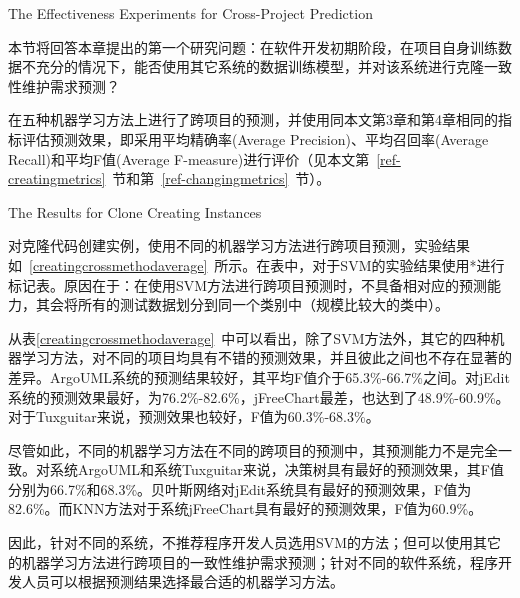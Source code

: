 {The Effectiveness Experiments for Cross-Project Prediction}

本节将回答本章提出的第一个研究问题：在软件开发初期阶段，在项目自身训练数据不充分的情况下，能否使用其它系统的数据训练模型，并对该系统进行克隆一致性维护需求预测？

在五种机器学习方法上进行了跨项目的预测，并使用同本文第3章和第4章相同的指标评估预测效果，即采用平均精确率(Average Precision)、平均召回率(Average Recall)和平均F值(Average F-measure)进行评价（见本文第~\ref{ref-creatingmetrics}~节和第~\ref{ref-changingmetrics}~节）。

{The Results for Clone Creating Instances}

对克隆代码创建实例，使用不同的机器学习方法进行跨项目预测，实验结果如~\ref{creatingcrossmethodaverage}~所示。在表中，对于SVM的实验结果使用{*}进行标记表。原因在于：在使用SVM方法进行跨项目预测时，不具备相对应的预测能力，其会将所有的测试数据划分到同一个类别中（规模比较大的类中）。

从表\ref{creatingcrossmethodaverage}~中可以看出，除了SVM方法外，其它的四种机器学习方法，对不同的项目均具有不错的预测效果，并且彼此之间也不存在显著的差异。ArgoUML系统的预测结果较好，其平均F值介于65.3\%-66.7\%之间。对jEdit系统的预测效果最好，为76.2\%-82.6\%，jFreeChart最差，也达到了48.9\%-60.9\%。对于Tuxguitar来说，预测效果也较好，F值为60.3\%-68.3\%。

尽管如此，不同的机器学习方法在不同的跨项目的预测中，其预测能力不是完全一致。对系统ArgoUML和系统Tuxguitar来说，决策树具有最好的预测效果，其F值分别为66.7\%和68.3\%。贝叶斯网络对jEdit系统具有最好的预测效果，F值为82.6\%。而KNN方法对于系统jFreeChart具有最好的预测效果，F值为60.9\%。

因此，针对不同的系统，不推荐程序开发人员选用SVM的方法；但可以使用其它的机器学习方法进行跨项目的一致性维护需求预测；针对不同的软件系统，程序开发人员可以根据预测结果选择最合适的机器学习方法。

